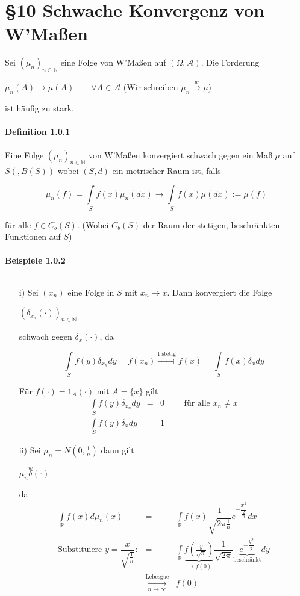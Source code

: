 \documentclass[10pt,a4paper]{report}
\newcommand{\N}{\mathbb{N}}
\newcommand{\R}{\mathbb{R}}
\numberwithin{equation}{section}
\numberwithin{figure}{section}
\theoremstyle{plain}
\theoremstyle{definition}
\theoremstyle{plain}
\theoremstyle{definition}
\theoremstyle{remark}
\theoremstyle{plain}
\theoremstyle{plain}
\theoremstyle{plain}
\newcommand{\1}{ \mathbb{1} } %
\begin{document}
\chapter*{\S 10 \qquad Schwache Konvergenz von W'Maßen}
Sei $(\mu_n)_{n \in \N}$ eine Folge von W'Maßen auf $(\Omega,\mathcal{A})$. Die Forderung
\begin{center}
$\mu_n(A) \to \mu(A) \qquad \forall A \in \mathcal{A}$ (Wir schreiben $\mu_n \overset{w}{\to} \mu$)
\end{center}
ist häufig zu stark.\\\\
\textbf{Definition 1.0.1}\\\\
Eine Folge $(\mu_n)_{n \in \N}$ von W'Maßen konvergiert schwach gegen ein Maß $\mu$ auf $S(,B(S))$ wobei $(S,d)$ ein metrischer Raum ist, falls
\begin{center}
\[\mu_n(f)=\int\limits_S f(x)\mu_n(dx) \to \int\limits_Sf(x)\mu(dx):=\mu(f)\]
\end{center}
für alle $f \in C_b(S)$. (Wobei $C_b(S)$ der Raum der stetigen, beschränkten Funktionen auf $S$)\\\\
\textbf{Beispiele 1.0.2}\\\\
\begin{itemize}
\item[i)] Sei $(x_n)$ eine Folge in $S$ mit $x_n \to x$. Dann konvergiert die Folge 
\begin{center}
$(\delta_{x_n}(\cdot))_{n \in \N}$
\end{center}
schwach gegen $\delta_x(\cdot)$, da
\begin{center}
\[\int\limits_Sf(y)\delta_{x_n} dy=f(x_n) \overset{\text{f stetig}}{\to} f(x)=\int\limits_S f(x)\delta_x dy \]
\end{center}
Für $f(\cdot)=1_A(\cdot)$ mit $A=\{x\}$ gilt
\begin{eqnarray*}
\int\limits_S f(y)\delta_{x_n} dy &=& 0 \qquad \text{ für alle } x_n \neq x\\
\int\limits_S f(y) \delta_x  dy &=& 1
\end{eqnarray*}
\item[ii)] Sei $\mu_n=N(0,\frac{1}{n})$ dann gilt
\begin{center}
$\mu_n \overset{w} \delta(\cdot)$
\end{center}
da
\begin{eqnarray*}
\int\limits_\R f(x) d\mu_n(x) &=& \int\limits_\R f(x)\dfrac{1}{\sqrt{2\pi \frac{1}{n}}}e^{-\dfrac{x^2}{\frac{2}{n}}} dx\\
\text{Substituiere } y=\dfrac{x}{\sqrt{\frac{1}{n}}}: &=& \int\limits_\R \underbrace{f\left(\frac{y}{\sqrt{n}}\right)}_{\to f(0)} \dfrac{1}{\sqrt{2\pi}}\underbrace{e^{-\dfrac{y^2}{2}}}_{\text{beschränkt}} dy\\
&\underset{n \to \infty}{\overset{\text{Lebesgue}}{\to}} &f(0)
\end{eqnarray*}
\end{itemize}
\end{document}
